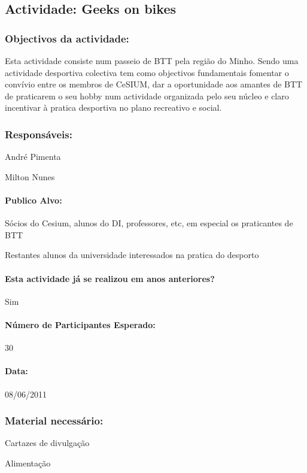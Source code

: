 \subsection{Actividade: Geeks on bikes}

\subsubsection*{Objectivos da actividade:}
Esta actividade consiste num passeio de BTT pela região do Minho. Sendo uma actividade desportiva colectiva tem como objectivos fundamentais fomentar o convívio entre os membros de CeSIUM, dar a oportunidade aos amantes de BTT de praticarem o seu hobby num actividade organizada pelo seu núcleo e claro incentivar à pratica desportiva no plano recreativo e social. 

\subsubsection*{Responsáveis:}
\begin{itemizedash}
	\item{André Pimenta}
	\item{Milton Nunes}
\end{itemizedash}

\paragraph{Publico Alvo: }
\begin{itemizedash}
     \item{Sócios do Cesium, alunos do DI, professores, etc, em especial os praticantes de BTT}
     \item{Restantes alunos da universidade interessados na pratica do desporto}
\end{itemizedash}

\paragraph{Esta actividade já se realizou em anos anteriores?}
Sim
\paragraph{Número de Participantes Esperado:}
30
\paragraph{Data:} 08/06/2011

\subsubsection*{Material necessário:}
\begin{itemizedash}
	\item{Cartazes de divulgação}
	\item{Alimentação}
\end{itemizedash}

